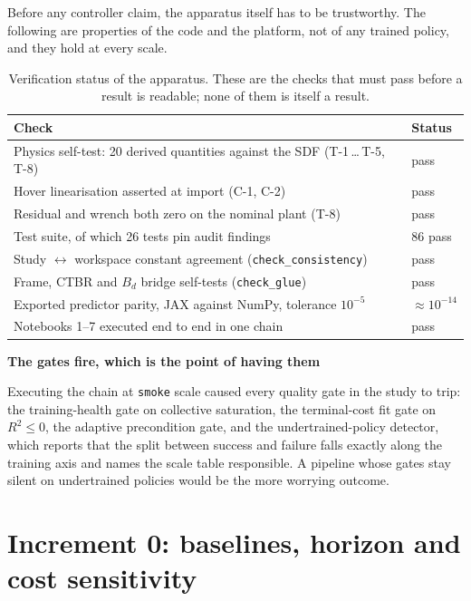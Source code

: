 \documentclass[11pt,a4paper,twoside,openright]{report}
\theoremstyle{plain}
\theoremstyle{definition}
\theoremstyle{remark}
\newcommand{\keyhead}[1]{\textbf{\sffamily\small\textcolor{NavyDeep}{#1}}\par\vspace{2pt}}
\begin{document}
	Before any controller claim, the apparatus itself has to be trustworthy. The
	following are properties of the code and the platform, not of any trained
	policy, and they hold at every scale.

	\begin{table}[htbp]
		\centering
		\caption{Verification status of the apparatus. These are the checks that must
			pass before a result is readable; none of them is itself a result.}
		\label{tab:res-verification}
		\small
		\begin{tabularx}{\linewidth}{@{}X l@{}}
			\toprule
			\textbf{Check} & \textbf{Status} \\
			\midrule
			Physics self-test: 20 derived quantities against the SDF (T-1\,\dots\,T-5, T-8) & pass \\
			Hover linearisation asserted at import (C-1, C-2) & pass \\
			Residual and wrench both zero on the nominal plant (T-8) & pass \\
			Test suite, of which 26 tests pin audit findings & 86 pass \\
			Study $\leftrightarrow$ workspace constant agreement (\texttt{check\_consistency}) & pass \\
			Frame, CTBR and $B_d$ bridge self-tests (\texttt{check\_glue}) & pass \\
			Exported predictor parity, JAX against NumPy, tolerance $10^{-5}$ & $\approx10^{-14}$ \\
			Notebooks 1--7 executed end to end in one chain & pass \\
			\bottomrule
		\end{tabularx}
	\end{table}

	\begin{keybox}
		\keyhead{The gates fire, which is the point of having them}
		Executing the chain at \texttt{smoke} scale caused every quality gate in the
		study to trip: the training-health gate on collective saturation, the
		terminal-cost fit gate on $R^2\le0$, the adaptive precondition gate, and the
		undertrained-policy detector, which reports that the split between success and
		failure falls exactly along the training axis and names the scale table
		responsible. A pipeline whose gates stay silent on undertrained policies would
		be the more worrying outcome.
	\end{keybox}

	\section{Increment 0: baselines, horizon and cost sensitivity}
	\label{sec:res-baselines}
\end{document}
